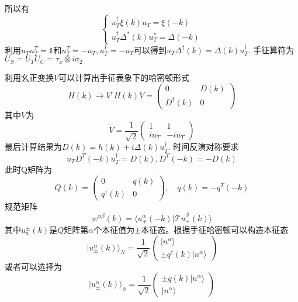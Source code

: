 \documentclass[a4paper]{article}
\numberwithin{equation}{subsection}
\begin{document}
所以有
\begin{equation}
    \begin{cases}
        u_T^\dagger\xi(k)u_T=\xi(-k)\\
        u_T^\dagger\Delta^*(k)u_T^*=\Delta(-k)
    \end{cases}
\end{equation}
利用$u_Tu_T^T=\mathbb{1}$和$u_T^T=-u_T,u_T^\dagger=-u_T$可以得到$u_T\Delta^\dagger(k)=\Delta(k)u_T^\dagger$. 手征算符为$U_S=U_TU_C=\tau_x\otimes i\sigma_2$

利用幺正变换$V$可以计算出手征表象下的哈密顿形式
\begin{equation}
    H(k)\rightarrow V^\dagger H(k)V=\begin{pmatrix}
        0&D(k)\\
        D^\dagger(k)&0
    \end{pmatrix}
\end{equation}
其中$V$为
\begin{equation}
    V=\frac{1}{\sqrt{2}}\begin{pmatrix}
        1&1\\
        iu_T&-iu_T
    \end{pmatrix}
\end{equation}
最后计算结果为$D(k)=h(k)+i\Delta(k)u_T^\dagger$. 时间反演对称要求
\begin{equation}
    u_T D^T(-k)u_T^\dagger=D(k),D^T(-k)=-D(k)
\end{equation}
此时Q矩阵为
\begin{equation}
    Q(k)=\begin{pmatrix}
        0&q(k)\\
        q^\dagger(k)&0
    \end{pmatrix},\quad q(k)=-q^T(-k)
\end{equation}
规范矩阵
\begin{equation}
    w^{\alpha\beta}(k)=\langle u^\alpha_+(-k)|\mathcal{T}u^\beta_+(k)\rangle
\end{equation}
其中$u_a^\pm(k)$是$Q$矩阵第$\alpha$个本征值为$\pm$本征态。根据手征哈密顿可以构造本征态
\begin{equation}
    |u^\alpha_\pm(k)\rangle_N=\frac{1}{\sqrt{2}}\begin{pmatrix}
        |n^\alpha\rangle\\
        \pm q^\dagger(k)|n^\alpha\rangle
    \end{pmatrix}
\end{equation}
或者可以选择为
\begin{equation}
    |u^\alpha_\pm(k)\rangle_S=\frac{1}{\sqrt{2}}\begin{pmatrix}
        \pm q(k)|n^\alpha\rangle\\
        |n^\alpha\rangle
    \end{pmatrix}
\end{equation}
\end{document}
